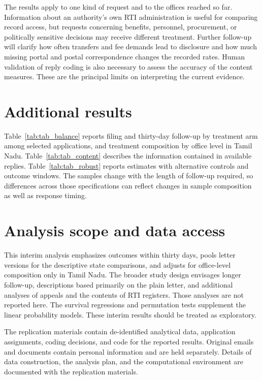 \documentclass[11pt]{article}
\begin{document}
The results apply to one kind of request and to the offices reached so far. Information about an authority's own RTI administration is useful for comparing record access, but requests concerning benefits, personnel, procurement, or politically sensitive decisions may receive different treatment. Further follow-up will clarify how often transfers and fee demands lead to disclosure and how much missing portal and postal correspondence changes the recorded rates. Human validation of reply coding is also necessary to assess the accuracy of the content measures. These are the principal limits on interpreting the current evidence.




\clearpage
\appendix
\section{Additional results}
Table~\ref{tab:tab_balance} reports filing and thirty-day follow-up by treatment arm among selected applications, and treatment composition by office level in Tamil Nadu. Table~\ref{tab:tab_content} describes the information contained in available replies. Table~\ref{tab:tab_robust} reports estimates with alternative controls and outcome windows. The samples change with the length of follow-up required, so differences across those specifications can reflect changes in sample composition as well as response timing.

\FloatBarrier

\FloatBarrier

\FloatBarrier

\section{Analysis scope and data access}
This interim analysis emphasizes outcomes within thirty days, pools letter versions for the descriptive state comparisons, and adjusts for office-level composition only in Tamil Nadu. The broader study design envisages longer follow-up, descriptions based primarily on the plain letter, and additional analyses of appeals and the contents of RTI registers. Those analyses are not reported here. The survival regressions and permutation tests supplement the linear probability models. These interim results should be treated as exploratory.

The replication materials contain de-identified analytical data, application assignments, coding decisions, and code for the reported results. Original emails and documents contain personal information and are held separately. Details of data construction, the analysis plan, and the computational environment are documented with the replication materials.
\end{document}
